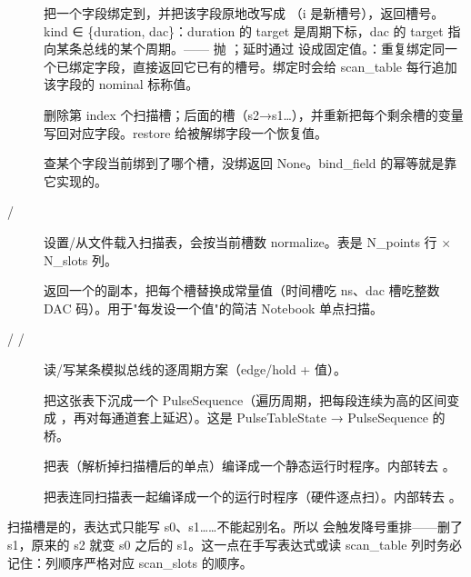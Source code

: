 \documentclass[11pt,oneside,openany]{book}
\begin{document}
\begin{description}
\item[] 把一个字段绑定到，并把该字段原地改写成 （i 是新槽号），返回槽号。kind ∈ \{duration, dac\}：duration 的 target 是周期下标，dac 的 target 指向某条总线的某个周期。—— 抛 ；延时通过  设成固定值。：重复绑定同一个已绑定字段，直接返回它已有的槽号。绑定时会给 scan\_table 每行追加该字段的 nominal 标称值。
\item[] 删除第 index 个扫描槽；后面的槽（s2→s1…），并重新把每个剩余槽的变量写回对应字段。restore 给被解绑字段一个恢复值。
\item[] 查某个字段当前绑到了哪个槽，没绑返回 None。bind\_field 的幂等就是靠它实现的。
\item[ / ] 设置/从文件载入扫描表，会按当前槽数 normalize。表是 N\_points 行 × N\_slots 列。
\item[] 返回一个的副本，把每个槽替换成常量值（时间槽吃 ns、dac 槽吃整数 DAC 码）。用于"每发设一个值"的简洁 Notebook 单点扫描。
\item[ /  / ] 读/写某条模拟总线的逐周期方案（edge/hold + 值）。
\item[] 把这张表下沉成一个 PulseSequence（遍历周期，把每段连续为高的区间变成 ，再对每通道套上延迟）。这是 PulseTableState → PulseSequence 的桥。
\item[] 把表（解析掉扫描槽后的单点）编译成一个静态运行时程序。内部转去 。
\item[] 把表连同扫描表一起编译成一个的运行时程序（硬件逐点扫）。内部转去 。
\end{description}

\begin{notebox}[槽号是位置而非名字]
扫描槽是的，表达式只能写 s0、s1……不能起别名。所以  会触发降号重排——删了 s1，原来的 s2 就变 s0 之后的 s1。这一点在手写表达式或读 scan\_table 列时务必记住：列顺序严格对应 scan\_slots 的顺序。
\end{notebox}
\end{document}
